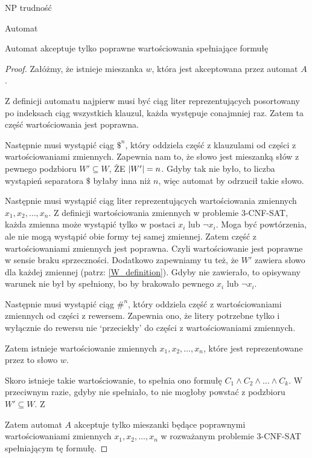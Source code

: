 \documentclass{article}
\theoremstyle{definition}
\theoremstyle{remark}
\begin{document}
\begin{section}{NP trudność}
\begin{subsection}{Automat}
\begin{subsection}{Automat akceptuje tylko poprawne wartościowania spełniające formułę}
         \begin{proof}
             Załóżmy, że istnieje mieszanka $w$, która jest akceptowana przez automat
             $A$.

             Z definicji automatu najpierw musi być ciąg liter reprezentujących posortowany
             po indeksach ciąg wszystkich klauzul, każda występuje conajmniej raz. Zatem ta
             część wartościowania jest poprawna.

             Następnie musi wystąpić ciąg $ \$^n $, który oddziela część z klauzulami od
             części z wartościowaniami zmiennych. Zapewnia nam to, że słowo jest mieszanką
             słów z pewnego podzbioru $W' \subseteq W$, ŻE $ \abs{W'} = n $. Gdyby tak nie
             było, to liczba wystąpień separatora $ \$ $ byłaby inna niż $n$, więc automat
             by odrzucił takie słowo.

             Następnie musi wystąpić ciąg liter reprezentujących wartościowania zmiennych
             $x_1, x_2, \ldots, x_n$. Z definicji wartościowania zmiennych w problemie
             3-CNF-SAT, każda zmienna może wystąpić tylko w postaci $x_i$ lub $\neg x_i$.
             Moga być powtórzenia, ale nie mogą wystąpić obie formy tej samej zmiennej.
             Zatem część z wartościowaniami zmiennych jest poprawna. Czyli wartościowanie
             jest poprawne w sensie braku sprzeczności. Dodatkowo zapewniamy tu też, że $W'$
             zawiera słowo dla każdej zmiennej (patrz: \ref{W_definition}). Gdyby nie
             zawierało, to opisywany warunek nie był by spełniony, bo by brakowało pewnego
             $x_i$ lub $\neg x_i$.

             Następnie musi wystąpić ciąg $ \#^n $, który oddziela część z wartościowaniami
             zmiennych od części z rewersem. Zapewnia ono, że litery potrzebne tylko i
             wyłącznie do rewersu nie `przeciekły' do części z wartościowaniami zmiennych.

             Zatem istnieje wartościowanie zmiennych $x_1, x_2, \ldots, x_n$, które jest
             reprezentowane przez to słowo $w$.

             Skoro istnieje takie wartościowanie, to spełnia ono formułę $C_1 \land C_2
                 \land \ldots \land C_k$. W przeciwnym razie, gdyby nie spełniało, to nie
             mogłoby powstać z podzbioru $W' \subseteq W$. Z

             Zatem automat $A$ akceptuje tylko mieszanki będące poprawnymi wartościowaniami
             zmiennych $x_1, x_2, \ldots, x_n$ w rozważanym problemie 3-CNF-SAT spełniającym
             tę formułę.
         \end{proof}


\end{subsection}
\end{subsection}
\end{section}
\end{document}
